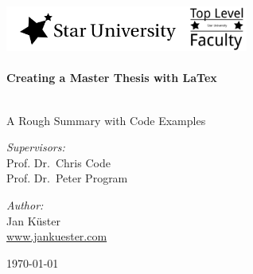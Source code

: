 \begin{titlepage}


\TITLEBOX

\begin{center}



\sffamily\textsc{\HUGE{\textcolor{white}{Master Thesis}}}\\[4cm]


\includegraphics[width=0.45\textwidth]{media/unilogo.png}\makebox[1.5cm]{}\includegraphics[width=0.15\textwidth]{media/faculty.png}~\\[1.5cm]



\HRule \\[0.4cm]
{
 \huge \bfseries \sffamily Creating a Master Thesis with LaTex  \\[0.4cm] 
}

\HRule \\[0.4cm] 

\normalfont \large \sffamily A Rough Summary with Code Examples\\[2.5cm]


\noindent
\begin{minipage}{0.4\textwidth}
\begin{flushleft} \large
\emph{Supervisors:} \\
Prof. Dr.~Chris Code\\
Prof. Dr.~Peter Program\\
\end{flushleft}
\end{minipage}%
\begin{minipage}{0.4\textwidth}
\begin{flushright} \large
\emph{Author:}\\
Jan  Küster\\
\url{www.jankuester.com}\\
\end{flushright}
\end{minipage}

\vfill


{\large \today}

\vfill



\vfill
\end{center}
\end{titlepage}

